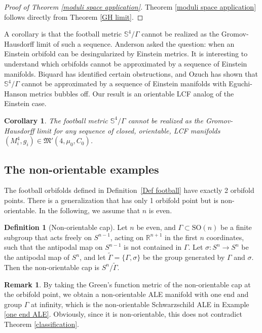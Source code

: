 \documentclass[12pt]{amsart}
\newtheorem{corollary}[theorem]{Corollary}
\theoremstyle{definition}
\newtheorem{definition}[theorem]{Definition}
\newtheorem{remark}[theorem]{Remark}
\begin{document}
\begin{proof}[Proof of Theorem \ref{moduli space application}]
    Theorem \ref{moduli space application} follows directly from Theorem \ref{GH limit}.
\end{proof}

A corollary is that the football metric $\mathbb{S}^4/\Gamma$ cannot be realized as the Gromov-Hausdorff limit of such a sequence. Anderson \cite{anderson2008survey} asked the question: when an Einstein orbifold can be desingularized by Einstein metrics. It is interesting to understand which orbifolds cannot be approximated by a sequence of Einstein manifolds. Biquard \cite{biquard} has identified certain obstructions, and Ozuch \cite{ozuch2022noncollapsed} has shown that $\mathbb{S}^4/\Gamma$ cannot be approximated by a sequence of Einstein manifolds with Eguchi-Hanson metrics bubbles off. Our result is an orientable LCF analog of the Einstein case.  

\begin{corollary}
\label{c:footnon}
    The football metric $\mathbb{S}^4/\Gamma$ cannot be realized as the Gromov-Hausdorff limit for any sequence of closed, orientable, LCF manifolds $(M^4_i,g_i)\in\mathfrak{M}'(4,\mu_0,C_0)$.
\end{corollary}

\subsection{The non-orientable examples}\label{nonorientable construction}
The football orbifolds defined in Definition~\ref{Def football} have exactly 2 orbifold points. There is a generalization that has only 1 orbifold point but is non-orientable. In the following, we assume that $n$ is even.

\begin{definition}[Non-orientable cap]  Let $n$ be even, and $\Gamma \subset \mathrm{SO}(n)$ be a finite subgroup that acts freely on $S^{n-1}$, acting on $\mathbb{R}^{n+1}$ in the first $n$ coordinates, such that the antipodal map on $S^{n-1}$ is not contained in $\Gamma$. Let $\sigma: S^n \rightarrow S^n$ be the antipodal map of $S^n$, and let $\tilde{\Gamma} = \{ \Gamma, \sigma\}$ be the group generated by $\Gamma$ and $\sigma$. Then the non-orientable cap is $S^n/\tilde{\Gamma}$.
\end{definition}

\begin{remark}
\label{r:gfcap} By taking the Green's function metric of the non-orientable cap at the orbifold point, we obtain a non-orientable ALE manifold with one end and group $\Gamma$ at infinity, which is the non-orientable Schwarzschild ALE in Example \ref{one end ALE}. Obviously, since it is non-orientable, this does not contradict Theorem \ref{classification}.
\end{remark}
\end{document}

